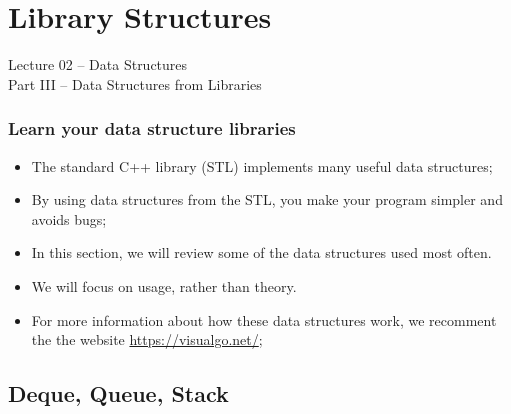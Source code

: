 \section{Library Structures}
\begin{frame}
  \begin{center}
    {\large Lecture 02 -- Data Structures\\Part III -- Data Structures from Libraries}\\
  \end{center}
\end{frame}

\begin{frame}
  \frametitle{Learn your data structure libraries}

  \begin{itemize}
    \item The standard C++ library (STL) implements many useful data structures;
    \item By using data structures from the STL, you make your program simpler and avoids bugs;
      \bigskip

    \item In this section, we will review some of the data structures used most often.
    \item We will focus on usage, rather than theory.
      \bigskip

    \item For more information about how these data structures work, we recomment the the website \url{https://visualgo.net/};
  \end{itemize}

\end{frame}

\subsection{Deque, Queue, Stack}

